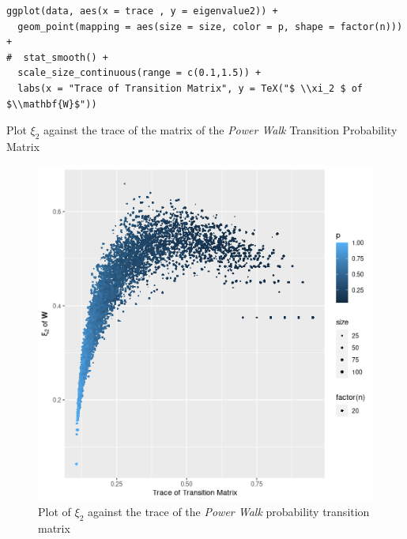 \documentclass[11pt]{article}
\begin{document}
\begin{listing}[htbp]
\begin{verbatim}
ggplot(data, aes(x = trace , y = eigenvalue2)) +
  geom_point(mapping = aes(size = size, color = p, shape = factor(n))) +
#  stat_smooth() +
  scale_size_continuous(range = c(0.1,1.5)) +
  labs(x = "Trace of Transition Matrix", y = TeX("$ \\xi_2 $ of $\\mathbf{W}$"))
\end{verbatim}
\caption{\label{trace_plot_er}Plot \(\xi_{2}\) against the trace of the matrix of the \emph{Power Walk} Transition Probability Matrix}
\end{listing}

\begin{figure}[htbp]
\centering
\includegraphics[width=12cm]{media/trace_plot_er.png}
\caption{\label{fig:trace_plot_er}Plot of \(\xi_{2}\) against the trace of the \emph{Power Walk} probability transition matrix}
\end{figure}
\end{document}
